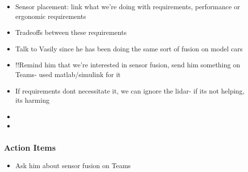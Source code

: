 \begin{itemize}
				\item Sensor placement: link what we're doing with requirements, performance or ergonomic requirements 
				\item Tradeoffs between these requirements
				\item Talk to Vasily since he has been doing the same sort of fusion on model cars 
				\item !!Remind him that we're interested in sensor fusion, send him something on Teams- used matlab/simulink for it 
				\item If requirements dont necessitate it, we can ignore the lidar- if its not helping, its harming
				\item 
				\item 
			\end{itemize}

		\subsubsection*{Action Items}
			\begin{itemize}
				\item Ask him about sensor fusion on Teams
			\end{itemize}


